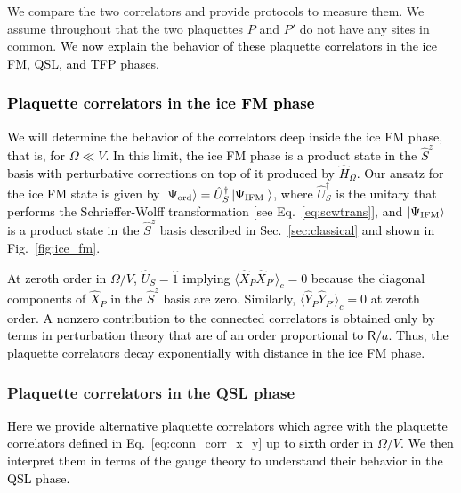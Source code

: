 \documentclass[twocolumn,superscriptaddress,amsmath,amssymb,aps,prx,nofootinbib]{revtex4-2}
\newcommand{\newtext}[1]{\textcolor{black}{#1}}
\begin{document}
We compare the two correlators and provide protocols to measure them.
We assume throughout that the two plaquettes $P$ and $P'$ do not have any sites in common. 
\newtext{We now explain the behavior of these plaquette correlators in the ice FM, QSL, and TFP phases.}

\newtext{\subsubsection{Plaquette correlators in the ice FM phase}}

\newtext{We will determine the behavior of the correlators deep inside the ice FM phase, that is, for $\Omega \ll V$. In this limit, the ice FM phase is a product state in the $\hat{S}^z$ basis with perturbative corrections on top of it produced by $\hat{H}_\Omega$. Our ansatz for the ice FM state is given by $\ket{\Psi_{\text{ord}}}=\hat{U}_S^{\dagger}\ket{\Psi_{\text{IFM }}}$, where $\hat{U}_S^\dagger$ is the unitary that performs the Schrieffer-Wolff transformation [see Eq.~\eqref{eq:scwtrans}], and $\ket{\Psi_\text{IFM}}$ is a product state in the $\hat{S}^z$ basis described in Sec.~\ref{sec:classical} and shown in Fig.~\ref{fig:ice_fm}.}

\newtext{At zeroth order in $\Omega/V$, $\hat{U}_S = \hat{1}$ implying $\langle \hat{X}_P \hat{X}_{P'} \rangle_c = 0$ because the diagonal components of $\hat{X}_{P}$ in the $\hat{S}^z$ basis are zero. Similarly, $\langle \hat{Y}_P \hat{Y}_{P'} \rangle_c =0 $ at zeroth order. A nonzero contribution to the connected correlators is obtained only by terms in perturbation theory that are of an order proportional to $\mathsf{R}/a$. Thus, the plaquette correlators decay exponentially with distance in the ice FM phase. }

\subsubsection{Plaquette correlators in the QSL phase}

\newtext{Here we provide alternative plaquette correlators which agree with the plaquette correlators defined in Eq.~\eqref{eq:conn_corr_x_y} up to sixth order in $\Omega/V$. We then interpret them in terms of the gauge theory to understand their behavior in the QSL phase. }
\end{document}
